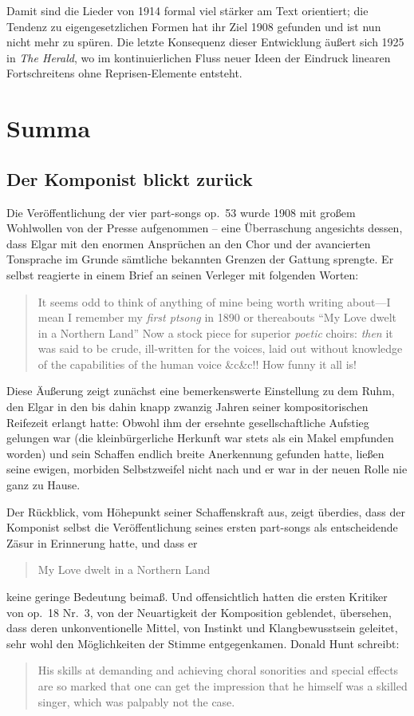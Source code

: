 \documentclass[a4paper,11pt,open=any]{scrbook}
\newcommand{\engquote}[1]{\foreignblockquote{english}{#1}}
\begin{document}
Damit sind die Lieder von 1914 formal viel stärker am Text orientiert; die
Tendenz zu eigengesetzlichen Formen hat ihr Ziel 1908 gefunden und ist nun
nicht mehr zu spüren.  Die letzte Konsequenz dieser Entwicklung äußert sich
1925 in \textit{The Herald}, wo im kontinuierlichen Fluss neuer Ideen der
Eindruck linearen Fortschreitens ohne Reprisen-Elemente entsteht.



\chapter{Summa}

\section{Der Komponist blickt zurück}
Die Veröffentlichung der vier part-songs op.~53 wurde 1908 mit großem
Wohlwollen von der Presse aufgenommen – eine Überraschung angesichts dessen,
dass Elgar mit den enormen Ansprüchen an den Chor und der avancierten
Tonsprache im Grunde sämtliche bekannten Grenzen der Gattung sprengte.  Er
selbst reagierte in einem Brief an seinen Verleger mit folgenden Worten:

\engquote{It seems odd to think of anything of mine being worth writing
about—I mean I remember my \emph{first ptsong} in 1890 or thereabouts
\enquote{My Love dwelt in a Northern Land} Now a stock piece for superior
\emph{poetic} choirs: \emph{then} it was said to be crude, ill-written for
the voices, laid out without knowledge of the capabilities of the human
voice \&c\&c!!  How funny it all is!\cite[Bd.~2, S.~693]{elgar-publ}}

Diese Äußerung zeigt zunächst eine bemerkenswerte Einstellung zu dem Ruhm,
den Elgar in den bis dahin knapp zwanzig Jahren seiner kompositorischen
Reifezeit erlangt hatte: Obwohl ihm der ersehnte gesellschaftliche Aufstieg
gelungen war (die kleinbürgerliche Herkunft war stets als ein Makel empfunden
worden) und sein Schaffen endlich breite Anerkennung gefunden hatte, ließen
seine ewigen, morbiden Selbstzweifel nicht nach und er war in der neuen
Rolle nie ganz zu Hause.

Der Rückblick, vom Höhepunkt seiner Schaffenskraft aus, zeigt überdies,
dass der Komponist selbst die Veröffentlichung seines ersten part-songs
als entscheidende Zäsur in Erinnerung hatte, und dass er \engquote{My Love
dwelt in a Northern Land} keine geringe Bedeutung beimaß.  Und offensichtlich
hatten die ersten Kritiker von op.~18 Nr.~3, von der Neuartigkeit der
Komposition geblendet, übersehen, dass deren unkonventionelle Mittel, von
Instinkt und Klangbewusstsein geleitet, sehr wohl den Möglichkeiten der
Stimme entgegenkamen.  Donald Hunt schreibt: \engquote{His skills at
demanding and achieving choral sonorities and special effects are so
marked that one can get the impression that he himself was a skilled
singer, which was palpably not the case.}\cite[S.~xi]{ece13}
\end{document}
